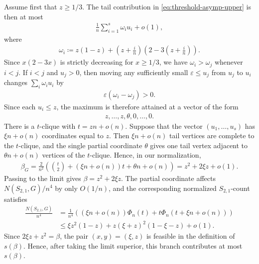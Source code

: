 \documentclass[10pt,a4paper]{article}
\begin{document}
    Assume first that $z\ge1/3$.  The tail contribution in \eqref{eq:threshold-asymp-upper} is then at most
    \begin{align*}
      \frac1n\sum_{i=1}^s \omega_i u_i+o(1),
    \end{align*}
    where
    \begin{align*}
      \omega_i\coloneqq z(1-z)+\left(z+\frac{i}{n}\right)\left(2-3\left(z+\frac{i}{n}\right)\right).
    \end{align*}
    Since $x(2-3x)$ is strictly decreasing for $x\ge1/3$, we have
    $\omega_i>\omega_j$ whenever $i<j$.   If $i<j$ and $u_j>0$, then
    moving any sufficiently small $\varepsilon\le u_j$ from $u_j$ to
    $u_i$ changes $\sum_i\omega_i u_i$ by
    \begin{align*}
      \varepsilon(\omega_i-\omega_j)>0.
    \end{align*}
    Since each $u_i\le z$, the maximum is
    therefore attained at a vector of the form
    \begin{align*}
      z,\ldots,z,\theta,0,\ldots,0.
    \end{align*}
    There is a $t$-clique with $t=zn+o(n)$.  Suppose that the vector
    $(u_1,\ldots,u_s)$ has $\xi n+o(n)$ coordinates equal to $z$.  Then
    $\xi n+o(n)$ tail vertices are complete to the $t$-clique, and the single
    partial coordinate $\theta$ gives one tail vertex adjacent to
    $\theta n+o(n)$ vertices of the $t$-clique.  Hence, in our normalization,
    \begin{align*}
      \beta_G
      =\frac{2}{n^2}\left(\binom{t}{2}+(\xi n+o(n))t+\theta n+o(n)\right)
      =z^2+2\xi z+o(1).
    \end{align*}
    Passing to the limit gives $\beta=z^2+2\xi z$.  The partial coordinate affects
    $N(S_{2,1},G)/n^4$ by only $O(1/n)$, and the corresponding normalized
    $S_{2,1}$-count satisfies
    \begin{align*}
      \frac{N(S_{2,1},G)}{n^4}
      &=\frac{1}{n^4}\left((\xi n+o(n))\Phi_n(t)
        +t\Phi_n(t+\xi n+o(n))\right)\\
      &
      \le \xi z^2(1-z)+z(\xi+z)^2(1-\xi-z)+o(1).
    \end{align*}
    Since $2\xi z+z^2=\beta$, the pair $(x,y)=(\xi,z)$ is feasible in the
    definition of $s(\beta)$.  Hence, after taking the limit superior, this branch contributes at most $s(\beta)$.
    
\end{document}
